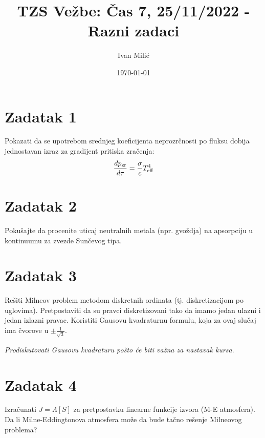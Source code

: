 \documentclass[12pt]{article}
\title{TZS Ve\v{z}be: \v{C}as 7, 25/11/2022 - Razni zadaci}
\author{Ivan Mili\'{c}}
\date{\today}
\begin{document}
\maketitle

\section*{Zadatak 1}

Pokazati da se upotrebom srednjeg koeficijenta neprozr\v{c}nosti po fluksu dobija jednostavan izraz za gradijent pritiska zra\v{c}enja:
\begin{equation}
\frac{dp_{\rm zr}}{d \tau} = \frac{\sigma}{c} T_{\rm eff}^4 
\end{equation}

\section*{Zadatak 2}
Poku\v{s}ajte da procenite uticaj neutralnih metala (npr. gvo\v{z}dja) na apsorpciju u kontinuumu za zvezde Sun\v{c}evog tipa. 

\section*{Zadatak 3}
Re\v{s}iti Milneov problem metodom diskretnih ordinata (tj. diskretizacijom po uglovima). Pretpostaviti da su pravci diskretizovani tako da imamo jedan ulazni i jedan izlazni pravac. Koristiti Gausovu kvadraturnu formulu, koja za ovaj slu\v{c}aj ima \v{c}vorove u $\pm \frac{1}{\sqrt{3}}$. 

\emph{Prodiskutovati Gausovu kvadraturu po\v{s}to \'{c}e biti va\v{z}na za nastavak kursa}.

\section*{Zadatak 4}
Izra\v{c}unati $J= \Lambda[S]$ za pretpostavku linearne funkcije izvora (M-E atmosfera). Da li Milne-Eddingtonova atmosfera mo\v{z}e da bude ta\v{c}no re\v{s}enje Milneovog problema?
\end{document}
